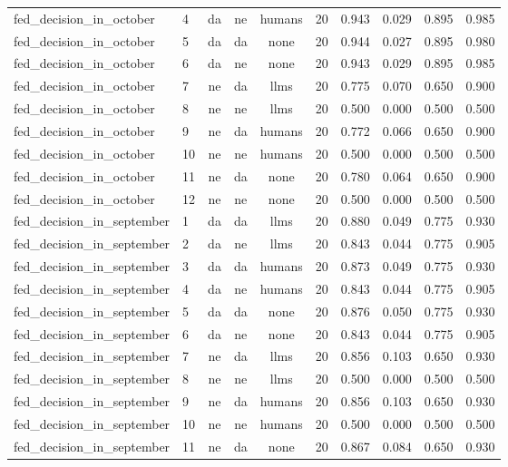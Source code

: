 \begin{longtable}{llccclrrrr}
fed\_decision\_in\_october & 4 & da & ne & humans & 20 & 0.943 & 0.029 & 0.895 & 0.985 \\
fed\_decision\_in\_october & 5 & da & da & none & 20 & 0.944 & 0.027 & 0.895 & 0.980 \\
fed\_decision\_in\_october & 6 & da & ne & none & 20 & 0.943 & 0.029 & 0.895 & 0.985 \\
fed\_decision\_in\_october & 7 & ne & da & llms & 20 & 0.775 & 0.070 & 0.650 & 0.900 \\
fed\_decision\_in\_october & 8 & ne & ne & llms & 20 & 0.500 & 0.000 & 0.500 & 0.500 \\
fed\_decision\_in\_october & 9 & ne & da & humans & 20 & 0.772 & 0.066 & 0.650 & 0.900 \\
fed\_decision\_in\_october & 10 & ne & ne & humans & 20 & 0.500 & 0.000 & 0.500 & 0.500 \\
fed\_decision\_in\_october & 11 & ne & da & none & 20 & 0.780 & 0.064 & 0.650 & 0.900 \\
fed\_decision\_in\_october & 12 & ne & ne & none & 20 & 0.500 & 0.000 & 0.500 & 0.500 \\
fed\_decision\_in\_september & 1 & da & da & llms & 20 & 0.880 & 0.049 & 0.775 & 0.930 \\
fed\_decision\_in\_september & 2 & da & ne & llms & 20 & 0.843 & 0.044 & 0.775 & 0.905 \\
fed\_decision\_in\_september & 3 & da & da & humans & 20 & 0.873 & 0.049 & 0.775 & 0.930 \\
fed\_decision\_in\_september & 4 & da & ne & humans & 20 & 0.843 & 0.044 & 0.775 & 0.905 \\
fed\_decision\_in\_september & 5 & da & da & none & 20 & 0.876 & 0.050 & 0.775 & 0.930 \\
fed\_decision\_in\_september & 6 & da & ne & none & 20 & 0.843 & 0.044 & 0.775 & 0.905 \\
fed\_decision\_in\_september & 7 & ne & da & llms & 20 & 0.856 & 0.103 & 0.650 & 0.930 \\
fed\_decision\_in\_september & 8 & ne & ne & llms & 20 & 0.500 & 0.000 & 0.500 & 0.500 \\
fed\_decision\_in\_september & 9 & ne & da & humans & 20 & 0.856 & 0.103 & 0.650 & 0.930 \\
fed\_decision\_in\_september & 10 & ne & ne & humans & 20 & 0.500 & 0.000 & 0.500 & 0.500 \\
fed\_decision\_in\_september & 11 & ne & da & none & 20 & 0.867 & 0.084 & 0.650 & 0.930 \\

\end{longtable}
